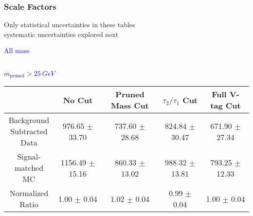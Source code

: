 \documentclass{beamer}
\begin{document}
\begin{frame}
  \frametitle{Scale Factors}
  Only statistical uncertainties in these tables \\ systematic uncertainties explored next
  \begin{adjustwidth}{-1.5em}{-1.5em}
    \centering
    \vspace{6pt}
    \textcolor{blue}{All mass}
    \vspace{6pt}

    {\scriptsize
      \begin{tabular}{c | c | c | c | c}

      \end{tabular}
    }

    \vspace{6pt}
    \textcolor{blue}{$m_\text{pruned} > \SI{25}{GeV}$}
    \vspace{6pt}

    {\scriptsize
      \begin{tabular}{c | c | c | c | c}
        \hline
        & No Cut & Pruned Mass Cut & $\tau_2/\tau_1$ Cut & Full V-tag Cut \\
        \hline
        \makecell{Background \\ Subtracted \\ Data} & 976.65 $\pm$ 33.70 & 737.60 $\pm$ 28.68 & 824.84 $\pm$ 30.47 & 671.90 $\pm$ 27.34 \\
        \makecell{Signal-\\ matched MC} & 1156.49 $\pm$ 15.16 & 860.33 $\pm$ 13.02 & 988.32 $\pm$ 13.81 & 793.25 $\pm$ 12.33 \\
        \hline
        \makecell{Normalized \\ Ratio} & 1.00 $\pm$ 0.04 & 1.02 $\pm$ 0.04 & 0.99 $\pm$ 0.04 & 1.00 $\pm$ 0.04 \\
        \hline
      \end{tabular}
    }
  \end{adjustwidth}
\end{frame}
\end{document}
